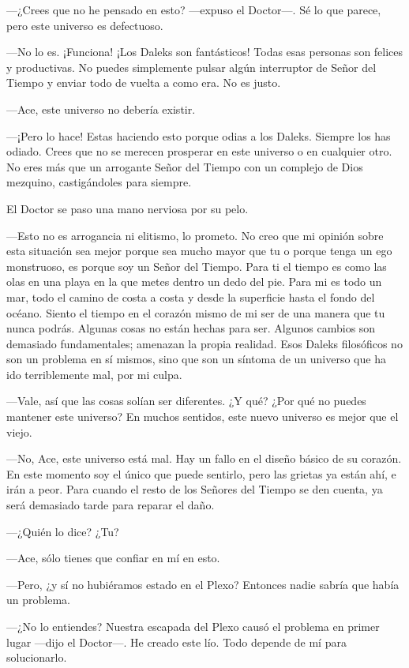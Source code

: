 ---¿Crees que no he pensado en esto? ---expuso el Doctor---. Sé
lo que parece, pero este universo es defectuoso.

---No lo es. ¡Funciona! ¡Los Daleks son fantásticos! Todas esas
personas son felices y productivas. No puedes simplemente pulsar algún
interruptor de Señor del Tiempo y enviar todo de vuelta a como era. No
es justo.

---Ace, este universo no debería existir.

---¡Pero lo hace! Estas haciendo esto porque odias a los Daleks.
Siempre los has odiado. Crees que no se merecen prosperar en este
universo o en cualquier otro. No eres más que un arrogante Señor del
Tiempo con un complejo de Dios mezquino, castigándoles para siempre.

El Doctor se paso una mano nerviosa por su pelo.

---Esto no es arrogancia ni elitismo, lo prometo. No creo que mi
opinión sobre esta situación sea mejor porque sea mucho mayor que tu o
porque tenga un ego monstruoso, es porque soy un Señor del Tiempo. Para
ti el tiempo es como las olas en una playa en la que metes dentro un
dedo del pie. Para mi es todo un mar, todo el camino de costa a costa y
desde la superficie hasta el fondo del océano. Siento el tiempo en el
corazón mismo de mi ser de una manera que tu nunca podrás. Algunas cosas
no están hechas para ser. Algunos cambios son demasiado fundamentales;
amenazan la propia realidad. Esos Daleks filosóficos no son un problema
en sí mismos, sino que son un síntoma de un universo que ha ido
terriblemente mal, por mi culpa.

---Vale, así que las cosas solían ser diferentes. ¿Y qué? ¿Por
qué no puedes mantener este universo? En muchos sentidos, este nuevo
universo es mejor que el viejo.

---No, Ace, este universo está mal. Hay un fallo en el diseño
básico de su corazón. En este momento soy el único que puede sentirlo,
pero las grietas ya están ahí, e irán a peor. Para cuando el resto de
los Señores del Tiempo se den cuenta, ya será demasiado tarde para
reparar el daño.

---¿Quién lo dice? ¿Tu?

---Ace, sólo tienes que confiar en mí en esto.

---Pero, ¿y sí no hubiéramos estado en el Plexo? Entonces nadie
sabría que había un problema.

---¿No lo entiendes? Nuestra escapada del Plexo causó el
problema en primer lugar ---dijo el Doctor---. He creado este lío. Todo
depende de mí para solucionarlo.

